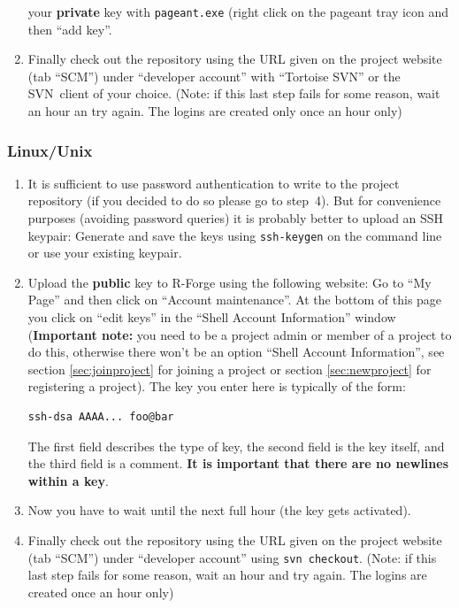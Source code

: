 \documentclass[a4paper]{article}
\newcommand{\proglang}[1]{\textsf{#1}}
\begin{document}
\begin{enumerate}
  your \textbf{private} key with \texttt{pageant.exe} (right click on
  the pageant tray icon and then ``add key''.
\item Finally check out the repository using the URL given on the
  project website (tab ``SCM'') under ``developer account'' with
  ``Tortoise SVN'' or the SVN~client of your choice. (Note: if this last step
  fails for some reason, wait an hour an try again. The logins are
  created only once an hour only)
\end{enumerate}

\subsubsection{Linux/Unix}
\label{sec:scm-unix}

\begin{enumerate}
\item It is sufficient to use password authentication to write to the
  project repository (if you decided to do so please go to
  step~4). But for convenience purposes (avoiding password 
  queries) it is probably better to upload an SSH keypair: Generate
  and save the keys 
  using \texttt{ssh-keygen} on the command line or use your existing keypair.  
\item Upload the \textbf{public} key to \proglang{R}-Forge using the following
  website: Go to 
  ``My Page'' and then click on ``Account maintenance''. At the bottom
  of this page you click on ``edit keys'' in the ``Shell Account
  Information'' window (\textbf{Important note:} you need to be a project admin
  or member of a project to do this, otherwise there won't be an
  option ``Shell Account Information'', see section
  \ref{sec:joinproject} for joining a project or section
  \ref{sec:newproject} for registering a project).
  The key you enter here is typically of the form:
\begin{verbatim}
ssh-dsa AAAA... foo@bar
\end{verbatim}
  The first field
  describes the type of key, the second field is the key itself, and
  the third field is a comment. \textbf{It is important that there are
    no newlines within a key}.
\item Now you have to wait until the next full hour (the key gets activated).
\item Finally check out the repository using the URL given on the
  project website (tab ``SCM'') under ``developer account'' using
  \texttt{svn checkout}. (Note: if this last step
  fails for some reason, wait an hour and try again. The logins are
  created once an hour only)
\end{enumerate}
\end{document}
